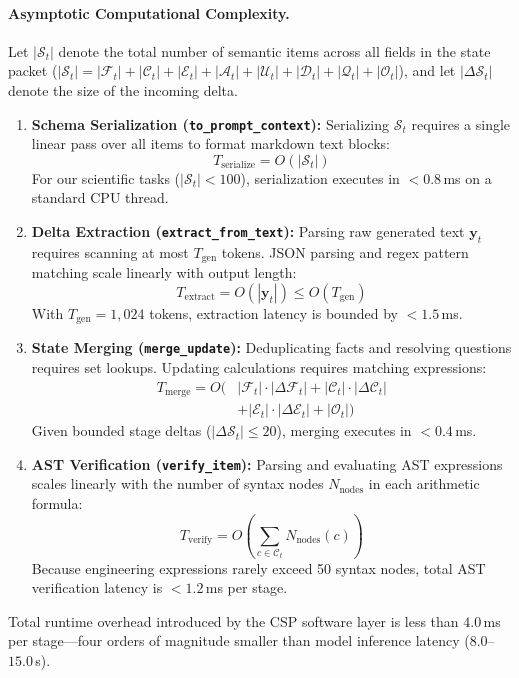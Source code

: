 \paragraph{Asymptotic Computational Complexity.}
Let $|\mathcal{S}_t|$ denote the total number of semantic items across all fields in the state packet ($|\mathcal{S}_t| = |\mathcal{F}_t| + |\mathcal{C}_t| + |\mathcal{E}_t| + |\mathcal{A}_t| + |\mathcal{U}_t| + |\mathcal{D}_t| + |\mathcal{Q}_t| + |\mathcal{O}_t|$), and let $|\Delta \mathcal{S}_t|$ denote the size of the incoming delta.
\begin{enumerate}
    \item \textbf{Schema Serialization (\texttt{to\_prompt\_context}):} Serializing $\mathcal{S}_t$ requires a single linear pass over all items to format markdown text blocks:
    \begin{equation}
    T_{\text{serialize}} = O(|\mathcal{S}_t|)
    \end{equation}
    For our scientific tasks ($|\mathcal{S}_t| < 100$), serialization executes in $< 0.8$\,ms on a standard CPU thread.
    \item \textbf{Delta Extraction (\texttt{extract\_from\_text}):} Parsing raw generated text $\mathbf{y}_t$ requires scanning at most $T_{\text{gen}}$ tokens. JSON parsing and regex pattern matching scale linearly with output length:
    \begin{equation}
    T_{\text{extract}} = O(|\mathbf{y}_t|) \le O(T_{\text{gen}})
    \end{equation}
    With $T_{\text{gen}} = 1,024$ tokens, extraction latency is bounded by $< 1.5$\,ms.
    \item \textbf{State Merging (\texttt{merge\_update}):} Deduplicating facts and resolving questions requires set lookups. Updating calculations requires matching expressions:
    \begin{equation}
    \begin{aligned}
    T_{\text{merge}} = O\Big(&|\mathcal{F}_t| \cdot |\Delta \mathcal{F}_t| + |\mathcal{C}_t| \cdot |\Delta \mathcal{C}_t| \\
    &+ |\mathcal{E}_t| \cdot |\Delta \mathcal{E}_t| + |\mathcal{O}_t|\Big)
    \end{aligned}
    \end{equation}
    Given bounded stage deltas ($|\Delta \mathcal{S}_t| \le 20$), merging executes in $< 0.4$\,ms.
    \item \textbf{AST Verification (\texttt{verify\_item}):} Parsing and evaluating AST expressions scales linearly with the number of syntax nodes $N_{\text{nodes}}$ in each arithmetic formula:
    \begin{equation}
    T_{\text{verify}} = O\left(\sum_{c \in \mathcal{C}_t} N_{\text{nodes}}(c)\right)
    \end{equation}
    Because engineering expressions rarely exceed 50 syntax nodes, total AST verification latency is $< 1.2$\,ms per stage.
\end{enumerate}
Total runtime overhead introduced by the CSP software layer is less than $4.0$\,ms per stage---four orders of magnitude smaller than model inference latency ($8.0$--$15.0$\,s).


